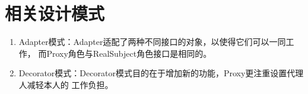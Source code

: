 \section{相关设计模式}
\begin{enumerate}
	\item Adapter模式：Adapter适配了两种不同接口的对象，以使得它们可以一同工作，
	而Proxy角色与RealSubject角色接口是相同的。
	\item Decorator模式：Decorator模式目的在于增加新的功能，Proxy更注重设置代理人减轻本人的
	工作负担。
\end{enumerate}